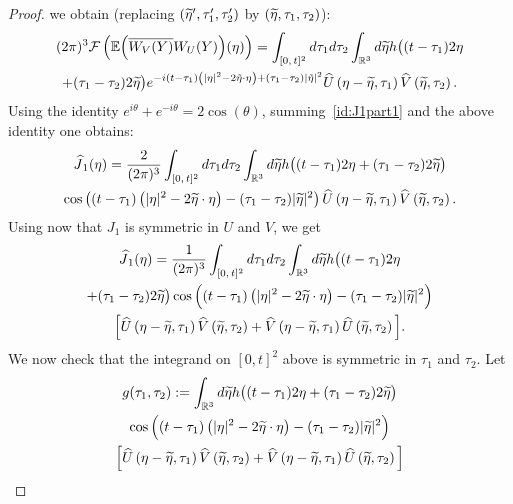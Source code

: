 \documentclass[AHL, Unicode, longabstracts,published]{cedram}
\newcommand{\R}{\mathbb{R}}
\newcommand{\E}{\mathbb{E}}
\newcommand{\mclF}{\mathcal{F}}
\let\oldtilde\tilde
\renewcommand*{\tilde}[1]{\mathchoice{\widetilde{#1}}{\widetilde{#1}}{\oldtilde{#1}}{\oldtilde{#1}}}
\let\oldhat\hat
\renewcommand*{\hat}[1]{\mathchoice{\widehat{#1}}{\widehat{#1}}{\oldhat{#1}}{\oldhat{#1}}}
\begin{document}
\begin{proof}
we obtain (replacing $(\tilde \eta',\tau_1',\tau_2')$ by $(\tilde \eta,\tau_1,\tau_2)$):
\begin{multline*}
(2\pi)^{3}\mclF \left(\E\Big(\overline{W_V(Y)} W_U(Y)\Big)(\eta)\right)
= \int_{[0,\,t]^2} d\tau_1d\tau_2\int_{\R^3} d\tilde{\eta} h\big((t-\tau_1)2\eta \\
+ (\tau_1-\tau_2) 2\tilde{\eta}\big) e^{-i(t-\tau_1)\left(|\eta|^2-2\tilde{\eta}\cdot \eta\right)+(\tau_1-\tau_2)|\tilde{\eta}|^2 }\hat U\left(\eta-\tilde{\eta},\tau_1\right) \hat V\left(\tilde{\eta},\tau_2\right).
\end{multline*}
Using the identity $e^{i\theta}+e^{-i\theta}=2\cos (\theta)$, summing~\eqref{id:J1part1} and the above identity one obtains:
\begin{multline*}
\hat J_1(\eta)=\frac{2}{(2\pi)^3} \int_{[0,\,t]^2} d\tau_1d\tau_2\int_{\R^3} d\tilde{\eta}h\big((t-\tau_1)2\eta + (\tau_1-\tau_2) 2\tilde{\eta}\big) \\
 \cos\left((t-\tau_1)\left(|\eta|^2-2\tilde{\eta}\cdot \eta\right)-(\tau_1-\tau_2)|\tilde{\eta}|^2\right)\hat U\left(\eta-\tilde{\eta},\tau_1\right) \hat V\left(\tilde{\eta},\tau_2\right).
\end{multline*}
Using now that $J_1$ is symmetric in $U$ and $V$, we get
\begin{multline*}
\hat J_1(\eta) =\frac{1}{(2\pi)^3} \int_{[0,\,t]^2}d\tau_1 d\tau_2 \int_{\R^3} d\tilde{\eta} h\big((t-\tau_1)2\eta \\
+ (\tau_1-\tau_2) 2\tilde{\eta}\big) \cos\Big((t-\tau_1)\left(|\eta|^2-2\tilde{\eta}\cdot \eta\right)-(\tau_1-\tau_2)|\tilde{\eta}|^2 \Big)\\
\Big[\hat U\left(\eta-\tilde{\eta},\tau_1\right) \hat V\left(\tilde{\eta},\tau_2\right)+ \hat V\left(\eta-\tilde{\eta},\tau_1\right) \hat U\left(\tilde{\eta},\tau_2\right)\Big].
\end{multline*}
We now check that the integrand on $[0,t]^2$ above is symmetric in $\tau_1$ and $\tau_2$. Let
\begin{multline*}
g(\tau_1,\tau_2) := \int_{\R^3} d\tilde{\eta} h\big((t-\tau_1)2\eta + (\tau_1-\tau_2) 2\tilde{\eta}\big)\\
\cos\Big((t-\tau_1)\left(|\eta|^2-2\tilde{\eta}\cdot \eta\right)-(\tau_1-\tau_2)|\tilde{\eta}|^2 \Big)\\
\Big[\hat U\left(\eta-\tilde{\eta},\tau_1\right) \hat V\left(\tilde{\eta},\tau_2\right)+ \hat V\left(\eta-\tilde{\eta},\tau_1\right) \hat U\left(\tilde{\eta},\tau_2\right)\Big]
\end{multline*}

\end{proof}
\end{document}
